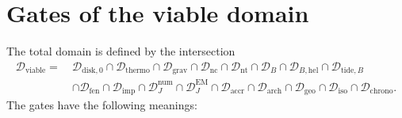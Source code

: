 \documentclass[11pt,a4paper,openany]{report}
\begin{document}
\section{Gates of the viable domain}

The total domain is defined by the intersection
\begin{equation}
\boxed{\begin{aligned}
\mathcal{D}_{\mathrm{viable}}=\ &\mathcal{D}_{\mathrm{disk},0}\cap\mathcal{D}_{\mathrm{thermo}}
\cap\mathcal{D}_{\mathrm{grav}}\cap\mathcal{D}_{\mathrm{nc}}\cap\mathcal{D}_{\mathrm{nt}}
\cap\mathcal{D}_{B}\cap\mathcal{D}_{B,\mathrm{hel}}\cap\mathcal{D}_{\mathrm{tide},B}\\
&\cap\mathcal{D}_{\mathrm{fen}}\cap\mathcal{D}_{\mathrm{imp}}
\cap\mathcal{D}_{J}^{\mathrm{num}}\cap\mathcal{D}_{J}^{\mathrm{EM}}
\cap\mathcal{D}_{\mathrm{accr}}\cap\mathcal{D}_{\mathrm{arch}}
\cap\mathcal{D}_{\mathrm{geo}}\cap\mathcal{D}_{\mathrm{iso}}\cap\mathcal{D}_{\mathrm{chrono}}.
\end{aligned}}
\label{eq:Dviable}
\end{equation}
The gates have the following meanings:
\end{document}
